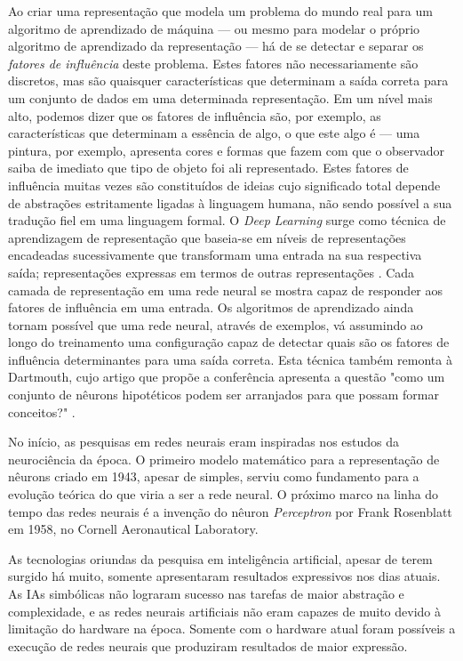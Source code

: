 \documentclass[12pt, a4paper]{article}
\begin{document}
Ao criar uma representação que modela um problema do mundo real para um algoritmo de aprendizado de máquina --- ou mesmo para modelar o próprio algoritmo de aprendizado da representação --- há de se detectar e separar os \emph{fatores de influência} deste problema. Estes fatores não necessariamente são discretos, mas são quaisquer características que determinam a saída correta para um conjunto de dados em uma determinada representação. Em um nível mais alto, podemos dizer que os fatores de influência são, por exemplo, as características que determinam a essência de algo, o que este algo é --- uma pintura, por exemplo, apresenta cores e formas que fazem com que o observador saiba de imediato que tipo de objeto foi ali representado. Estes fatores de influência muitas vezes são constituídos de ideias cujo significado total depende de abstrações estritamente ligadas à linguagem humana, não sendo possível a sua tradução fiel em uma linguagem formal. O \emph{Deep Learning} surge como técnica de aprendizagem de representação que baseia-se em níveis de representações encadeadas sucessivamente que transformam uma entrada na sua respectiva saída; representações expressas em termos de outras representações \cite[p.5]{Goodfellow-et-al-2016}. Cada camada de representação em uma rede neural se mostra capaz de responder aos fatores de influência em uma entrada. Os algoritmos de aprendizado ainda tornam possível que uma rede neural, através de exemplos, vá assumindo ao longo do treinamento uma configuração capaz de detectar quais são os fatores de influência determinantes para uma saída correta. 
Esta técnica também remonta à Dartmouth, cujo artigo que propõe a conferência apresenta a questão "como um conjunto de nêurons hipotéticos podem ser arranjados para que possam formar conceitos?" \cite{dartmouth}.

No início, as pesquisas em redes neurais eram inspiradas nos estudos da neurociência da época. O primeiro modelo matemático para a representação de nêurons \cite{mcculloch_pitts} criado em 1943, apesar de simples, serviu como fundamento para a evolução teórica do que viria a ser a rede neural. O próximo marco na linha do tempo das redes neurais é a invenção do nêuron \emph{Perceptron} por Frank Rosenblatt em 1958, no Cornell Aeronautical Laboratory.

As tecnologias oriundas da pesquisa em inteligência artificial, apesar de terem surgido há muito, somente apresentaram resultados expressivos nos dias atuais. As IAs simbólicas não lograram sucesso nas tarefas de maior abstração e complexidade, e as redes neurais artificiais não eram capazes de muito devido à limitação do hardware na época. Somente com o hardware atual foram possíveis a execução de redes neurais que produziram resultados de maior expressão.
\end{document}
